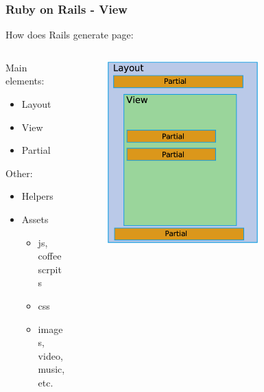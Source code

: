 \documentclass{beamer}
\theoremstyle{mystyle}
\begin{document}
\begin{frame}
  \frametitle{Ruby on Rails - View}
  How does Rails generate page:
  \begin{columns}
    \begin{column}{0.5\textwidth}
      Main elements:
      \begin{itemize}
        \item Layout
        \item View
        \item Partial 
      \end{itemize}
      Other:
      \begin{itemize}
        \item Helpers 
        \item Assets 
          \begin{itemize}
            \item js, coffee scrpits
            \item css
            \item images, video, music, etc.
          \end{itemize}
      \end{itemize}
    \end{column}
    
    \begin{column}{0.5\textwidth}
      \begin{figure}[h]
        \centering 
        \includegraphics[width = 0.7\textwidth]{./Layout_view_partial.eps}
      \end{figure}
    \end{column}
  \end{columns}
  
\end{frame}
\end{document}
